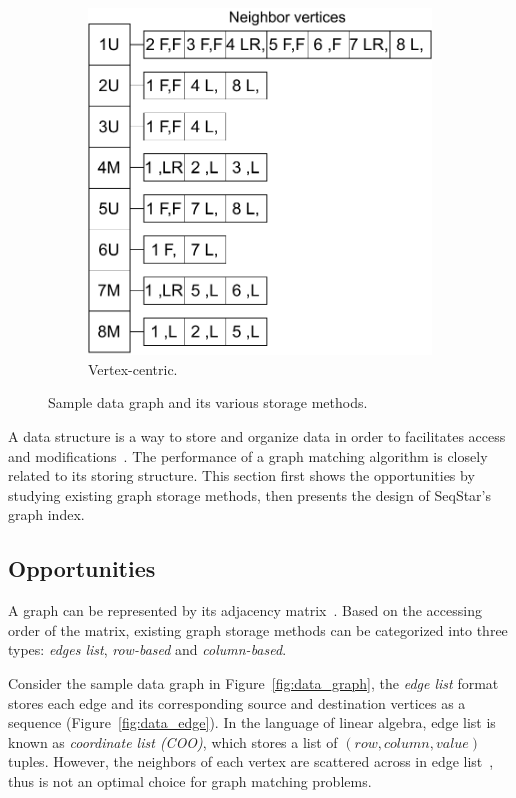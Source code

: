 \begin{figure}
\begin{minipage}[b]{0.68\textwidth}
\begin{subfigure}[b]{0.3\textwidth}
      \includegraphics[scale=0.3]{img/data_vertex_centric}
      \caption{Vertex-centric.}\label{fig:data_vertex_centric}
    \end{subfigure}
  \end{minipage}
  \caption{Sample data graph and its various storage methods.}\label{img:data}
\end{figure}
A data structure is a way to store and organize data in order to facilitates access and modifications~\cite{DBLP:books/daglib/0023376}.
The performance of a graph matching algorithm is closely related to its storing structure.
This section first shows the opportunities by studying existing graph storage methods,
then presents the design of SeqStar's graph index.

\subsection{Opportunities}
A graph can be represented by its adjacency matrix~\cite{DBLP:books/sp/BondyM08}.
Based on the accessing order of the matrix, existing graph storage methods can be categorized into three types:
\emph{edges list}, \emph{row-based} and \emph{column-based}.

Consider the sample data graph in Figure~\ref{fig:data_graph}, the \emph{edge list} format stores each edge and its corresponding source and destination vertices as a sequence (Figure~\ref{fig:data_edge}).
In the language of linear algebra, edge list is known as \emph{coordinate list (COO)}, which stores a list of $(row, column, value)$ tuples.
However, the neighbors of each vertex are scattered across in edge list~\cite{DBLP:conf/fast/KumarH19}, thus is not an optimal choice for graph matching problems.

